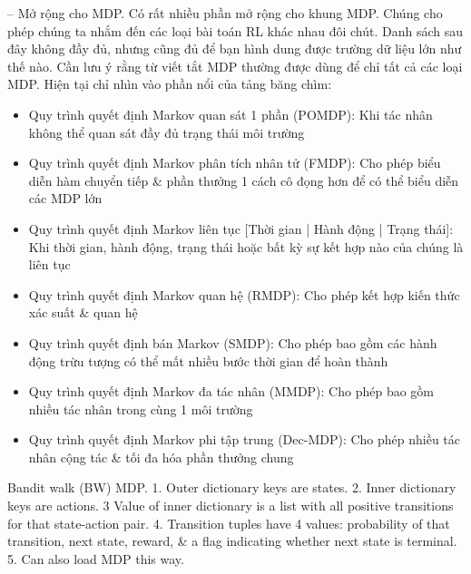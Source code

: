 \documentclass{article}
\begin{document}
\begin{itemize}
\begin{itemize}
        -- {\sf Mở rộng cho MDP.} Có rất nhiều phần mở rộng cho khung MDP. Chúng cho phép chúng ta nhắm đến các loại bài toán RL khác nhau đôi chút. Danh sách sau đây không đầy đủ, nhưng cũng đủ để bạn hình dung được trường dữ liệu lớn như thế nào. Cần lưu ý rằng từ viết tắt MDP thường được dùng để chỉ tất cả các loại MDP. Hiện tại chỉ nhìn vào phần nổi của tảng băng chìm:
        \begin{itemize}
            \item Quy trình quyết định Markov quan sát 1 phần (POMDP): Khi tác nhân không thể quan sát đầy đủ trạng thái môi trường
            \item Quy trình quyết định Markov phân tích nhân tử (FMDP): Cho phép biểu diễn hàm chuyển tiếp \& phần thưởng 1 cách cô đọng hơn để có thể biểu diễn các MDP lớn
            \item Quy trình quyết định Markov liên tục [Thời gian | Hành động | Trạng thái]: Khi thời gian, hành động, trạng thái hoặc bất kỳ sự kết hợp nào của chúng là liên tục
            \item Quy trình quyết định Markov quan hệ (RMDP): Cho phép kết hợp kiến thức xác suất \& quan hệ
            \item Quy trình quyết định bán Markov (SMDP): Cho phép bao gồm các hành động trừu tượng có thể mất nhiều bước thời gian để hoàn thành
            \item Quy trình quyết định Markov đa tác nhân (MMDP): Cho phép bao gồm nhiều tác nhân trong cùng 1 môi trường
            \item Quy trình quyết định Markov phi tập trung (Dec-MDP): Cho phép nhiều tác nhân cộng tác \& tối đa hóa phần thưởng chung
        \end{itemize}
        {\sf Bandit walk (BW) MDP.} 1. Outer dictionary keys are states. 2. Inner dictionary keys are actions. 3 Value of inner dictionary is a list with all positive transitions for that state-action pair. 4. Transition tuples have 4 values: probability of that transition, next state, reward, \& a flag indicating whether next state is terminal. 5. Can also load MDP this way.


\end{itemize}
\end{itemize}
\end{document}
